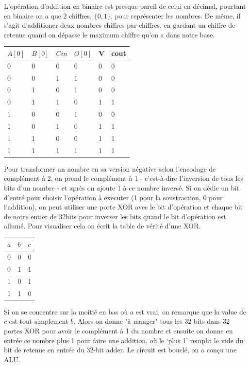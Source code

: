 \documentclass[10pt]{article} %
\begin{document}
    L'opération d'addition en binaire est presque pareil de celui en décimal, pourtant en binaire on a que $2$ chiffres, $\{0, 1\}$, pour représenter les nombres.
    De même, il s'agit d'additioner deux nombres chiffres par chiffres, en gardant un chiffre de retenue quand on dépasse le maximum chiffre qu'on a dans notre base.

    \begin{table}[h!]
        \hspace{1cm}
        \begin{tabular}{lll|l|l|l}
        $A[0]$ & $B[0]$ & $Cin$ & $O[0]$ & V & cout \\
        \hline
        0 & 0 & 0 & 0        & 0 & 0    \\
        0 & 0 & 1 & 1        & 0 & 0    \\
        0 & 1 & 0 & 1        & 0 & 0    \\
        0 & 1 & 1 & 0        & 1 & 1    \\
        1 & 0 & 0 & 1        & 0 & 0    \\
        1 & 0 & 1 & 0        & 1 & 1    \\
        1 & 1 & 0 & 0        & 1 & 1    \\
        1 & 1 & 1 & 1        & 1 & 1
        \end{tabular}
        \end{table}

Pour transformer un nombre en sa version négative selon l'encodage de complément à 2, on prend le complément à 1 - c'est-à-dire l'inversion de tous les bits d'un nombre - et
après on ajoute 1 à ce nombre inversé. Si on dédie un bit d'entré pour choisir l'opération à executer (1 pour la soustraction, 0 pour l'addition), on peut utiliser une porte
XOR avec le bit d'opération et chaque bit de notre entier de 32bits pour inverser les bits quand le bit d'opération est allumé. Pour visualiser cela on écrit la table de vérité
d'une XOR.

\begin{table}[h!]
    \hspace{1cm}
    \begin{tabular}{ll|l}
    $a$ & $b$ & $c$ \\
    \hline
    0 & 0 & 0 \\
    0 & 1 & 1 \\
    1 & 0 & 1 \\
    1 & 1 & 0
    \end{tabular}
    \end{table}

    Si on se concentre sur la moitié en bas où $a$ est vrai, on remarque que la value de $c$ est tout simplement $\bar b$. Alors on donne "à manger"
    tous les 32 bits dans 32 portes XOR pour avoir le complément à 1 du nombre et ensuite on donne en entrée ce nombre plus 1 pour faire une addition, où le `plus 1'
    remplit le vide du bit de retenue en entrée du 32-bit adder. Le circuit est bouclé, on a con\c cu une ALU.
\end{document}
